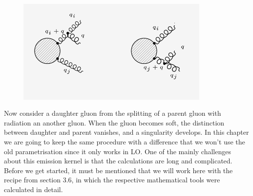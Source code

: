 
\begin{figure}[ht!]
\centering
\includegraphics[width=0.85\textwidth]{images/GG/GGDiagrams.png}
\end{figure}
Now consider a daughter gluon from the splitting of a parent gluon with radiation an another gluon. When the gluon becomes soft, the distinction between daughter and parent vanishes, and a singularity develops. In this chapter we are going to keep the same procedure with a difference that we won't use the old parametrisation since it only works in LO. One of the mainly challenges about this emission kernel is that the calculations are long and complicated. Before we get started, it must be mentioned that we will work here with the recipe from section 3.6, in which the respective mathematical tools were calculated in detail.
\pagebreak
